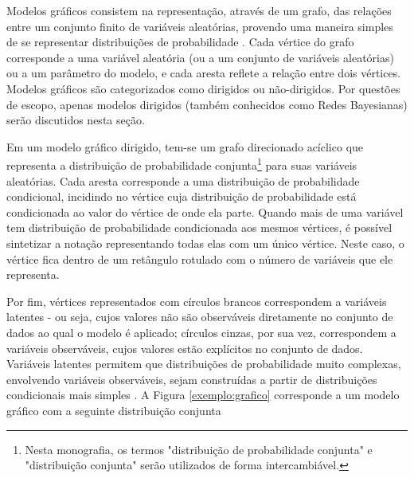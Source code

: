 
Modelos gráficos consistem na representação, através de um grafo, das relações entre um conjunto finito de variáveis aleatórias, provendo uma maneira simples de se representar distribuições de probabilidade \cite{bishop}. Cada vértice do grafo corresponde a uma variável aleatória (ou a um conjunto de variáveis aleatórias) ou a um parâmetro do modelo, e cada aresta reflete a relação entre dois vértices. Modelos gráficos são categorizados como dirigidos ou não-dirigidos. Por questões de escopo, apenas modelos dirigidos (também conhecidos como Redes Bayesianas) serão discutidos nesta seção.

Em um modelo gráfico dirigido, tem-se um grafo direcionado acíclico que representa a distribuição de probabilidade conjunta\footnote{Nesta monografia, os termos "distribuição de probabilidade conjunta" e "distribuição conjunta" serão utilizados de forma intercambiável.} para suas variáveis aleatórias. Cada aresta corresponde a uma distribuição de probabilidade condicional, incidindo no vértice cuja distribuição de probabilidade está condicionada ao valor do vértice de onde ela parte. Quando mais de uma variável tem distribuição de probabilidade condicionada aos mesmos vértices, é possível sintetizar a notação representando todas elas com um único vértice. Neste caso, o vértice fica dentro de um retângulo rotulado com o número de variáveis que ele representa. 

Por fim, vértices representados com círculos brancos correspondem a variáveis latentes - ou seja, cujos valores não são observáveis diretamente no conjunto de dados ao qual o modelo é aplicado; círculos cinzas, por sua vez, correspondem a variáveis observáveis, cujos valores estão explícitos no conjunto de dados. Variáveis latentes permitem que distribuições de probabilidade muito complexas, envolvendo variáveis observáveis, sejam construídas a partir de distribuições condicionais mais simples \cite{bishop}. A Figura \ref{exemplo:grafico} corresponde a um modelo gráfico com a seguinte distribuição conjunta

